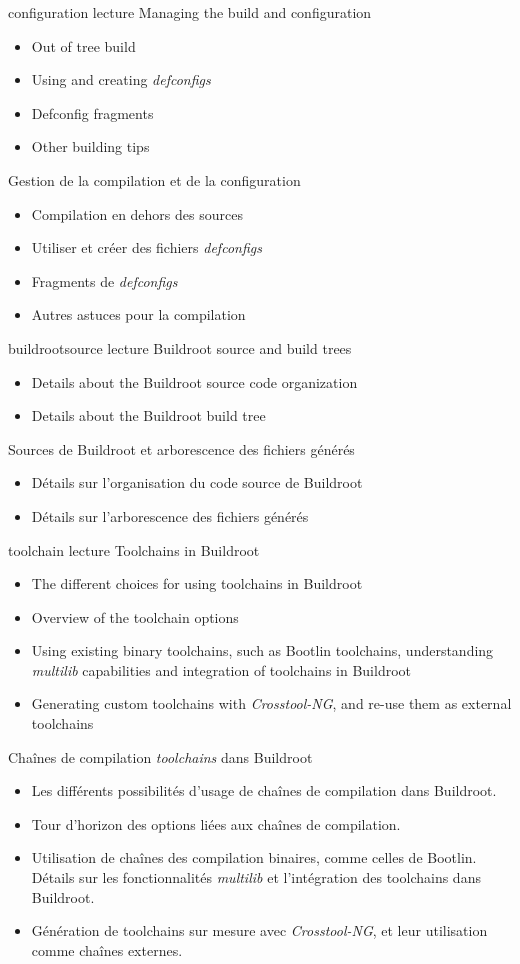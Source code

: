 {configuration}
{lecture}
{Managing the build and configuration}
{
  \begin{itemize}
  \item Out of tree build
  \item Using and creating {\em defconfigs}
  \item Defconfig fragments
  \item Other building tips
  \end{itemize}
}
{Gestion de la compilation et de la configuration}
{
  \begin{itemize}
  \item Compilation en dehors des sources
  \item Utiliser et créer des fichiers {\em defconfigs}
  \item Fragments de {\em defconfigs}
  \item Autres astuces pour la compilation
  \end{itemize}
}
{buildrootsource}
{lecture}
{Buildroot source and build trees}
{
  \begin{itemize}
  \item Details about the Buildroot source code organization
  \item Details about the Buildroot build tree
  \end{itemize}
}
{Sources de Buildroot et arborescence des fichiers générés}
{
  \begin{itemize}
  \item Détails sur l'organisation du code source de Buildroot
  \item Détails sur l'arborescence des fichiers générés
  \end{itemize}
}
{toolchain}
{lecture}
{Toolchains in Buildroot}
{
  \begin{itemize}
  \item The different choices for using toolchains in Buildroot
  \item Overview of the toolchain options
  \item Using existing binary toolchains, such as Bootlin
    toolchains, understanding {\em multilib} capabilities and
    integration of toolchains in Buildroot
  \item Generating custom toolchains with {\em Crosstool-NG}, and
    re-use them as external toolchains
  \end{itemize}
}
{Chaînes de compilation {\em toolchains} dans Buildroot}
{
  \begin{itemize}
  \item Les différents possibilités d'usage de chaînes de compilation
	dans Buildroot.
  \item Tour d'horizon des options liées aux chaînes de compilation.
  \item Utilisation de chaînes des compilation binaires, comme
	celles de Bootlin. Détails sur les fonctionnalités
        {\em multilib} et l'intégration des toolchains dans Buildroot.
  \item Génération de toolchains sur mesure avec {\em Crosstool-NG},
	et leur utilisation comme chaînes externes.
  \end{itemize}
}

